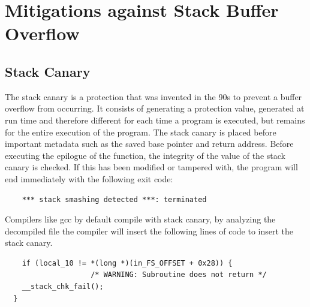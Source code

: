 \documentclass{report}
\begin{document}
    \section{Mitigations against Stack Buffer Overflow}
    \subsection{Stack Canary}
    The stack canary is a protection that was invented in the 90s to prevent a buffer overflow from occurring.
    It consists of generating a protection value, generated at run time and therefore different for each time a program is executed, but remains for the entire execution of the program.
    The stack canary is placed before important metadata such as the saved base pointer and return address.
    Before executing the epilogue of the function, the integrity of the value of the stack canary is checked. If this has been modified or tampered with, the program will end immediately with the following exit code:
    \begin{verbatim}
    *** stack smashing detected ***: terminated
    \end{verbatim}
    Compilers like gcc by default compile with stack canary, by analyzing the decompiled file the compiler will insert the following lines of code to insert the stack canary.\newline
    \begin{verbatim}
    if (local_10 != *(long *)(in_FS_OFFSET + 0x28)) {
                    /* WARNING: Subroutine does not return */
    __stack_chk_fail();
  }
    \end{verbatim}
    
\end{document}
